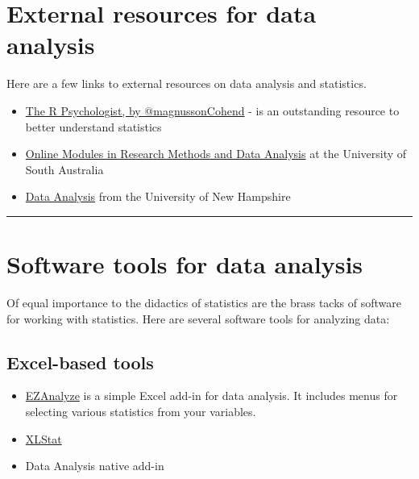 \documentclass[
  letterpaper,
  DIV=11,
  numbers=noendperiod]{scrreprt}
\providecommand{\tightlist}{%
  \setlength{\itemsep}{0pt}\setlength{\parskip}{0pt}}\usepackage{longtable,booktabs,array}
\begin{document}
\hypertarget{external-resources-for-data-analysis}{%
\section*{External resources for data
analysis}\label{external-resources-for-data-analysis}}

Here are a few links to external resources on data analysis and
statistics.

\begin{itemize}
\tightlist
\item
  \href{https://rpsychologist.com/}{The R Psychologist, by
  @magnussonCohend} - is an outstanding resource to better understand
  statistics
\item
  \href{https://lo.unisa.edu.au/course/view.php?id=8481}{Online Modules
  in Research Methods and Data Analysis} at the University of South
  Australia
\item
  \href{https://libraryguides.unh.edu/excel/analysis}{Data Analysis}
  from the University of New Hampshire
\end{itemize}

\begin{center}\rule{0.5\linewidth}{0.5pt}\end{center}

\hypertarget{software-tools-for-data-analysis}{%
\section*{Software tools for data
analysis}\label{software-tools-for-data-analysis}}

Of equal importance to the didactics of statistics are the brass tacks
of software for working with statistics. Here are several software tools
for analyzing data:

\hypertarget{excel-based-tools}{%
\subsection*{Excel-based tools}\label{excel-based-tools}}

\begin{itemize}
\tightlist
\item
  \href{http://www.ezanalyze.com/}{EZAnalyze} is a simple Excel add-in
  for data analysis. It includes menus for selecting various statistics
  from your variables.
\item
  \href{https://www.xlstat.com/en/}{XLStat}
\item
  Data Analysis native add-in
\end{itemize}
\end{document}
